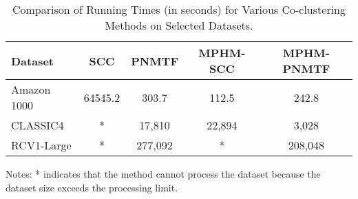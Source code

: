 
\begin{table*}[htbp]
    \centering
    \caption{Comparison of Running Times (in seconds) for Various Co-clustering Methods on Selected Datasets.}
    \label{tab:running-time}
    \begin{tabular}{@{} l cccc @{}}
        \toprule
        Dataset     & SCC \cite{dhillon2001CoclusteringDocumentsWords} & PNMTF \cite{chen2023ParallelNonNegativeMatrix} & \textbf{MPHM-SCC} & \textbf{MPHM-PNMTF} \\
        \midrule
        Amazon 1000 & 64545.2                                          & 303.7                                          & 112.5             & 242.8               \\
        CLASSIC4    & *                                                & 17,810                                         & 22,894            & 3,028               \\
        RCV1-Large  & *                                                & 277,092                                        & *                 & 208,048             \\
        \bottomrule
    \end{tabular}
    \begin{tablenotes}
        \small
        \item Notes: * indicates that the method cannot process the dataset because the dataset size exceeds the processing limit.
    \end{tablenotes}
\end{table*}

